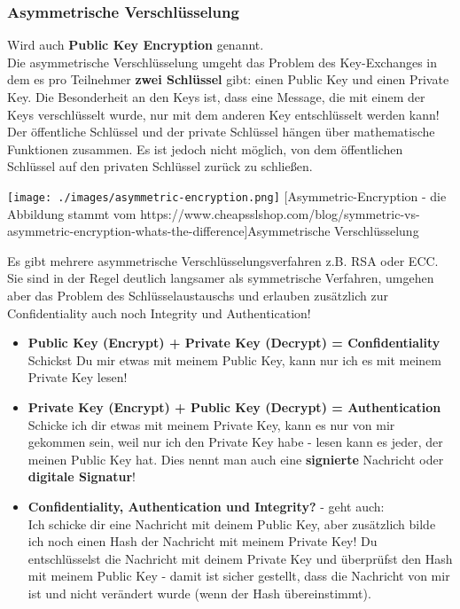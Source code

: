 \documentclass[10pt,a4paper,titlepage]{article}
\begin{document}
\subsubsection{Asymmetrische Verschlüsselung} \label{asym}
Wird auch \textbf{Public Key Encryption} genannt.\\
Die asymmetrische Verschlüsselung umgeht das Problem des Key-Exchanges in dem es pro Teilnehmer \textbf{zwei Schlüssel} gibt: einen Public Key und einen Private Key. Die Besonderheit an den Keys ist, dass eine Message, die mit einem der Keys verschlüsselt wurde, nur mit dem anderen Key entschlüsselt werden kann! Der öffentliche Schlüssel und der private Schlüssel hängen über mathematische Funktionen zusammen. Es ist jedoch nicht möglich, von dem öffentlichen Schlüssel auf den privaten Schlüssel zurück zu schließen.
\begin{center}
\texttt{[image: ./images/asymmetric-encryption.png]}
[Asymmetric-Encryption - die Abbildung stammt vom https://www.cheapsslshop.com/blog/symmetric-vs-asymmetric-encryption-whats-the-difference]{Asymmetrische Verschlüsselung}
\end{center}
Es gibt mehrere asymmetrische Verschlüsselungsverfahren z.B. RSA oder ECC. Sie sind in der Regel deutlich langsamer als symmetrische Verfahren, umgehen aber das Problem des Schlüsselaustauschs und erlauben zusätzlich zur Confidentiality auch noch Integrity und Authentication!
\begin{itemize}
\item \textbf{Public Key (Encrypt) + Private Key (Decrypt) = Confidentiality}\\Schickst Du mir etwas mit meinem Public Key, kann nur ich es mit meinem Private Key lesen!
\item \textbf{Private Key (Encrypt) + Public Key (Decrypt) = Authentication}\\Schicke ich dir etwas mit meinem Private Key, kann es nur von mir gekommen sein, weil nur ich den Private Key habe - lesen kann es jeder, der meinen Public Key hat. Dies nennt man auch eine \textbf{signierte} Nachricht oder \textbf{digitale Signatur}!
\item \textbf{Confidentiality, Authentication und Integrity?} - geht auch:\\
Ich schicke dir eine Nachricht mit deinem Public Key, aber zusätzlich bilde ich noch einen Hash der Nachricht mit meinem Private Key! Du entschlüsselst die Nachricht mit deinem Private Key und überprüfst den Hash mit meinem Public Key - damit ist sicher gestellt, dass die Nachricht von mir ist und nicht verändert wurde (wenn der Hash übereinstimmt).
\end{itemize}
\end{document}
